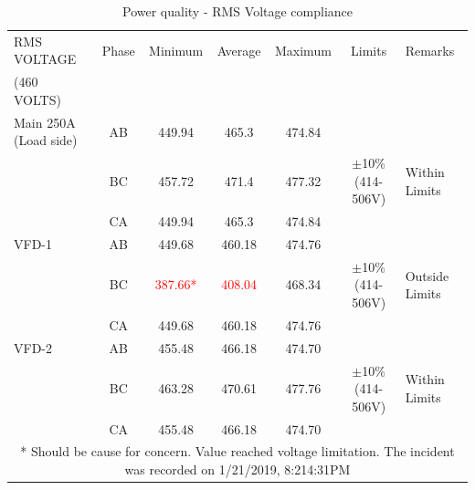 \begin{table}[!htb]
	\caption{Power quality - RMS Voltage compliance}
	\label{tbl_ch04_elecaudit_powerquality_rms}
	{\scriptsize
		
	\begin{tabular}{l|l|l|l|l|p{2cm}|l}
		\hline
		RMS VOLTAGE & \multicolumn{1}{c|}{Phase} & \multicolumn{1}{c|}{Minimum} & \multicolumn{1}{c|}{Average} & \multicolumn{1}{c|}{Maximum} & \multicolumn{1}{c|}{Limits} & Remarks \\ 
		(460 VOLTS) & \multicolumn{1}{c|}{} & \multicolumn{1}{c|}{} & \multicolumn{1}{c|}{} & \multicolumn{1}{c|}{} & \multicolumn{1}{c|}{} &  \\ 
		\hline
		Main 250A (Load side) & \multicolumn{1}{c|}{AB} & \multicolumn{1}{c|}{449.94} & \multicolumn{1}{c|}{465.3} & \multicolumn{1}{c|}{474.84} & \multicolumn{1}{c|}{} &  \\ 
		& \multicolumn{1}{c|}{BC} & \multicolumn{1}{c|}{457.72} & \multicolumn{1}{c|}{471.4} & \multicolumn{1}{c|}{477.32} & \multicolumn{1}{c|}{$\pm $10\% (414-506V)} & Within  Limits \\ 
		& \multicolumn{1}{c|}{CA} & \multicolumn{1}{c|}{449.94} & \multicolumn{1}{c|}{465.3} & \multicolumn{1}{c|}{474.84} & \multicolumn{1}{c|}{} &  \\ 
		\hline
		VFD-1 & \multicolumn{1}{c|}{AB} & \multicolumn{1}{c|}{449.68} & \multicolumn{1}{c|}{460.18} & \multicolumn{1}{c|}{474.76} & \multicolumn{1}{c|}{} &  \\ 
		& \multicolumn{1}{c|}{BC} & \multicolumn{1}{c|}{\textcolor{red}{387.66*}} & \multicolumn{1}{c|}{\textcolor{red}{408.04}} & \multicolumn{1}{c|}{468.34} & \multicolumn{1}{c|}{$\pm $10\% (414-506V)} & Outside  Limits \\ 
		& \multicolumn{1}{c|}{CA} & \multicolumn{1}{c|}{449.68} & \multicolumn{1}{c|}{460.18} & \multicolumn{1}{c|}{474.76} & \multicolumn{1}{c|}{} &  \\ 
		\hline
		VFD-2 & \multicolumn{1}{c|}{AB} & \multicolumn{1}{c|}{455.48} & \multicolumn{1}{c|}{466.18} & \multicolumn{1}{c|}{474.70} & \multicolumn{1}{c|}{} &  \\ 
		& \multicolumn{1}{c|}{BC} & \multicolumn{1}{c|}{463.28} & \multicolumn{1}{c|}{470.61} & \multicolumn{1}{c|}{477.76} & \multicolumn{1}{c|}{$\pm $10\% (414-506V)} & Within Limits \\ 
		& \multicolumn{1}{c|}{CA} & \multicolumn{1}{c|}{455.48} & \multicolumn{1}{c|}{466.18} & \multicolumn{1}{c|}{474.70} & \multicolumn{1}{c|}{} &  \\ 
		\hline
		\multicolumn{7}{c}{* Should be cause for concern. Value reached voltage limitation. The incident was recorded on 1/21/2019, 8:214:31PM } \\ 

	\end{tabular}
	
	}%
\end{table}


